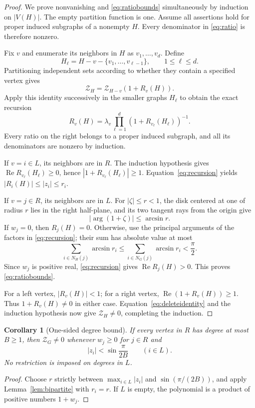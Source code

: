 \documentclass[11pt]{article}
\numberwithin{equation}{section}
\newtheorem{corollary}[theorem]{Corollary}
\theoremstyle{remark}
\newcommand{\calZ}{\mathcal Z}
\begin{document}
\begin{proof}
We prove nonvanishing and \eqref{eq:ratiobounds} simultaneously by induction
on $|V(H)|$. The empty partition function is one. Assume all assertions hold
for proper induced subgraphs of a nonempty $H$. Every denominator in
\eqref{eq:ratio} is therefore nonzero.

Fix $v$ and enumerate its neighbors in $H$ as $v_1,\ldots,v_d$. Define
\[
 H_\ell=H-v-\{v_1,\ldots,v_{\ell-1}\},\qquad 1\le\ell\le d.
\]
Partitioning independent sets according to whether they contain a specified
vertex gives
\begin{equation}\label{eq:deleteidentity}
 \calZ_H=\calZ_{H-v}(1+R_v(H)).
\end{equation}
Apply this identity successively in the smaller graphs $H_\ell$ to obtain
the exact recursion
\begin{equation}\label{eq:recursion}
 R_v(H)=\lambda_v\prod_{\ell=1}^d
                  (1+R_{v_\ell}(H_\ell))^{-1}.
\end{equation}
Every ratio on the right belongs to a proper induced subgraph, and all its
denominators are nonzero by induction.

If $v=i\in L$, its neighbors are in $R$. The induction hypothesis gives
$\operatorname{Re}R_{v_\ell}(H_\ell)\ge0$, hence
$|1+R_{v_\ell}(H_\ell)|\ge1$. Equation~\eqref{eq:recursion} yields
$|R_i(H)|\le|z_i|\le r_i$.

If $v=j\in R$, its neighbors are in $L$. For $|\zeta|\le r<1$, the disk
centered at one of radius $r$ lies in the right half-plane, and its two
tangent rays from the origin give
\begin{equation}\label{eq:argdisk}
 |\arg(1+\zeta)|\le\arcsin r.
\end{equation}
If $w_j=0$, then $R_j(H)=0$. Otherwise, use the principal arguments of the
factors in \eqref{eq:recursion}; their sum has absolute value at most
\[
 \sum_{i\in N_H(j)}\arcsin r_i
 \le\sum_{i\in N_G(j)}\arcsin r_i<\frac\pi2.
\]
Since $w_j$ is positive real, \eqref{eq:recursion} gives
$\operatorname{Re}R_j(H)>0$. This proves \eqref{eq:ratiobounds}.

For a left vertex, $|R_v(H)|<1$; for a right vertex,
$\operatorname{Re}(1+R_v(H))\ge1$. Thus $1+R_v(H)\ne0$ in either case.
Equation~\eqref{eq:deleteidentity} and the induction hypothesis now give
$\calZ_H\ne0$, completing the induction.
\end{proof}

\begin{corollary}[One-sided degree bound]\label{cor:bipartite}
If every vertex in $R$ has degree at most $B\ge1$, then $\calZ_G\ne0$
whenever $w_j\ge0$ for $j\in R$ and
\begin{equation}\label{eq:uniformradius}
 |z_i|<\sin\frac\pi{2B}\qquad(i\in L).
\end{equation}
No restriction is imposed on degrees in $L$.
\end{corollary}
\begin{proof}
Choose $r$ strictly between $\max_{i\in L}|z_i|$ and
$\sin(\pi/(2B))$, and apply Lemma~\ref{lem:bipartite} with $r_i=r$.
If $L$ is empty, the polynomial is a product of positive numbers $1+w_j$.
\end{proof}
\end{document}
